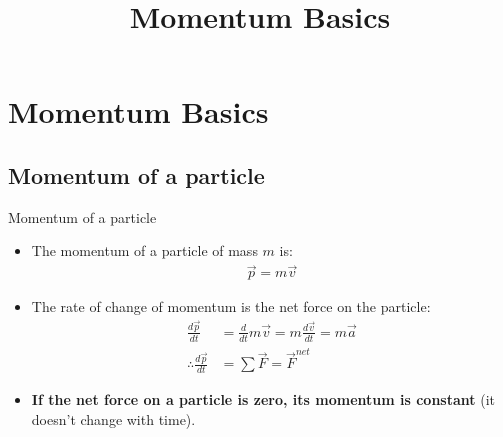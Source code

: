 \documentclass[aspectratio=169,
hyperref={colorlinks,urlcolor=blue}
]{beamer}
\begin{document}

{\tableofcontents[sections=25-26, subsectionstyle=show/show]\thispagestyle{empty}}
{\tableofcontents[sections=27, subsectionstyle=show/show]}










\section{Momentum Basics}
\label{sec:momentumbasics}
\title{Momentum Basics}
\author{\insertsubsection}


\begin{frame}
\titlepage
\thispagestyle{empty}
\end{frame}














\subsection{Momentum of  a particle}
\label{subsec:momentumofaparticle}
\begin{frame}{Momentum of a particle}
\begin{itemize}
\item The momentum of a particle of mass $m$ is:
\begin{align*}
\vec p = m \vec v
\end{align*}
\item The rate of change of momentum is the net force on the particle:
\begin{align*}
\frac{d\vec p}{dt} &= \frac{d}{dt}m\vec v= m\frac{d\vec v}{dt} = m\vec a\\
\therefore \frac{d\vec p}{dt} &= \sum \vec F = \vec F^{net}
\end{align*}
\item \textbf{If the net force on a particle is zero, its momentum is constant} (it doesn't change with time).
\end{itemize}

\end{frame}
\end{document}
